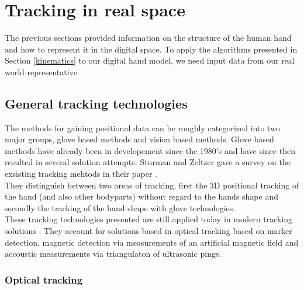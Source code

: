 \chapter{Tracking in real space}
The previous sections provided information on the structure of the human hand and how to represent it in the digital space. To apply the algorithms presented in Section \ref{kinematics} to our digital hand model, we need input data from our real world representative.
\section{General tracking technologies}
\label{General tracking technologies}
The methods for gaining positional data can be roughly categorized into two major groups, glove based methods and vision based methods. Glove based methods have already been in developement since the 1980's \cite{Bolt.1980} and have since then resulted in several solution attempts. Sturman and Zeltzer gave a survey on the exsisting tracking mehtods in their paper \cite{Sturman.1994}. \\They distinguish between two areas of tracking, first the 3D positional tracking of the hand (and also other bodyparts) without regard to the hands shape and secondly the tracking of the hand shape with glove technologies.\\These tracking technologies presented are still applied today in modern tracking solutions \cite{Welch.2002,Rolland.2001}. They account for solutions based in optical tracking based on marker detection, magnetic detection via measurements of an artificial magnetic field\cite{Raab.1979} and accoustic measurements via triangulaton of ultrasonic pings.

\subsection{Optical tracking}

